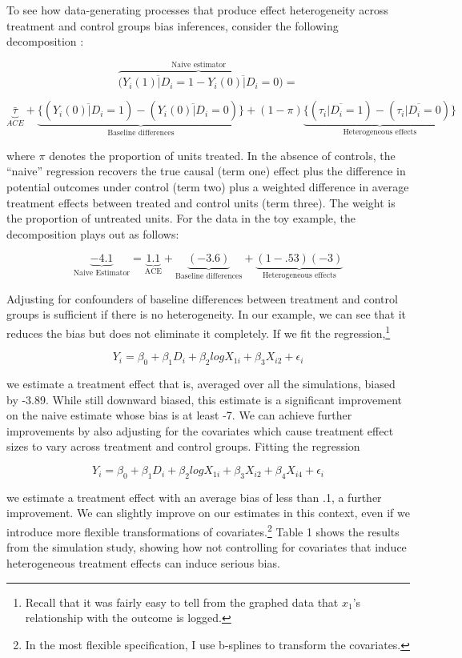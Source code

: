 \documentclass[hidelinks,11pt]{article}
\begin{document}
To see how data-generating processes that produce effect heterogeneity across treatment and control groups bias inferences, consider the following decomposition \citep{morganwinship1999}:


$$\overbrace{(\overline{Y_i(1)|D_i=1} - \overline{Y_i(0)|D_i=0}}^{\text{Naive estimator}}) = $$

$$\underbrace{\bar \tau}_{ACE}  + \underbrace{\{(\overline{Y_i(0)|D_i=1}) - (\overline{Y_i(0)|D_i=0})\}}_{\text{Baseline differences}} + (1 - \pi)\underbrace{\{(\overline{\tau_i|D_i=1}) - (\overline{\tau_i|D_i=0})\}}_{\text{Heterogeneous effects}}$$

where $\pi$ denotes the proportion of units treated. In the absence of controls, the ``naive'' regression recovers the true causal (term one) effect plus the difference in potential outcomes under control (term two) plus a weighted difference in average treatment effects between treated and control units (term three). The weight is the proportion of untreated units. For the data in the toy example, the decomposition plays out as follows:

$$\underbrace{-4.1}_{\text{Naive Estimator}} = \underbrace{1.1}_{\text{ACE}} + \underbrace{(-3.6)}_{\text{Baseline differences}} + \underbrace{(1 - .53)(-3)}_{\text{Heterogeneous effects}}$$

Adjusting for confounders of baseline differences between treatment and control groups is sufficient if there is no heterogeneity. In our example, we can see that it reduces the bias but does not eliminate it completely. If we fit the regression,\footnote{Recall that it was fairly easy to tell from the graphed data that $x_1$'s relationship with the outcome is logged.}

$$Y_i = \beta_0 + \beta_1 D_i + \beta_2 logX_{1i} + \beta_3 X_{i2} + \epsilon_i$$

we estimate a treatment effect that is, averaged over all the simulations, biased by -3.89. While still downward biased, this estimate is a significant improvement on the naive estimate whose bias is at least -7. We can achieve further improvements by also adjusting for the covariates which cause treatment effect sizes to vary across treatment and control groups. Fitting the regression

$$Y_i = \beta_0 + \beta_1 D_i + \beta_2 logX_{1i} + \beta_3 X_{i2} + \beta_4X_{i4} + \epsilon_i$$

we estimate a treatment effect with an average bias of less than .1, a further improvement. We can slightly improve on our estimates in this context, even if we introduce more flexible transformations of covariates.\footnote{In the most flexible specification, I use b-splines to transform the covariates.} Table 1 shows the results from the simulation study, showing how not controlling for covariates that induce heterogeneous treatment effects can induce serious bias.
\end{document}
